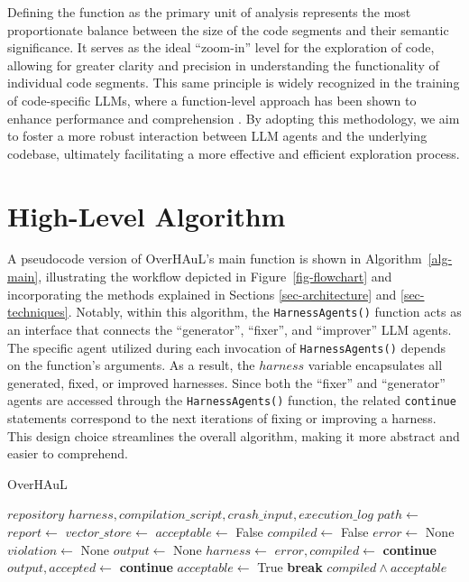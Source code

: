 \documentclass[
  a4paper,
]{scrreprt}
\theoremstyle{definition}
\theoremstyle{remark}
\begin{document}
Defining the function as the primary unit of analysis represents the
most proportionate balance between the size of the code segments and
their semantic significance. It serves as the ideal ``zoom-in'' level
for the exploration of code, allowing for greater clarity and precision
in understanding the functionality of individual code segments. This
same principle is widely recognized in the training of code-specific
LLMs, where a function-level approach has been shown to enhance
performance and comprehension \autocite{chen2021}. By adopting this
methodology, we aim to foster a more robust interaction between LLM
agents and the underlying codebase, ultimately facilitating a more
effective and efficient exploration process.

\section{High-Level Algorithm}\label{high-level-algorithm}

A pseudocode version of OverHAuL's main function is shown in
Algorithm~\ref{alg-main}, illustrating the workflow depicted in
Figure~\ref{fig-flowchart} and incorporating the methods explained in
Sections \ref{sec-architecture} and \ref{sec-techniques}. Notably,
within this algorithm, the \texttt{HarnessAgents()} function acts as an
interface that connects the ``generator'', ``fixer'', and ``improver''
LLM agents. The specific agent utilized during each invocation of
\texttt{HarnessAgents()} depends on the function's arguments. As a
result, the \(harness\) variable encapsulates all generated, fixed, or
improved harnesses. Since both the ``fixer'' and ``generator'' agents
are accessed through the \texttt{HarnessAgents()} function, the related
\texttt{continue} statements correspond to the next iterations of fixing
or improving a harness. This design choice streamlines the overall
algorithm, making it more abstract and easier to comprehend.

\begin{algorithm}[H]
\caption{OverHAuL}
\label{alg-main}
\begin{algorithmic}[1]
\Require $repository$
\Ensure $harness, compilation\_script, crash\_input, execution\_log$
  \State $path \gets$ 
  \State $report \gets$ 
  \State $vector\_store \gets$ 
  \State $acceptable \gets$ False
  \State $compiled \gets$ False
  \State $error \gets$ None
  \State $violation \gets$ None
  \State $output \gets$ None
    \State $harness \gets$ 
    \State $error, compiled \gets$ 
      \State \textbf{continue} 
    \EndIf
    \State $output, accepted \gets $
      \State \textbf{continue} 
    \Else
      \State $acceptable \gets$ True
      \State \textbf{break}
    \EndIf
  \EndFor
  \State \Return $compiled \land acceptable$
\end{algorithmic}
\end{algorithm}
\end{document}
